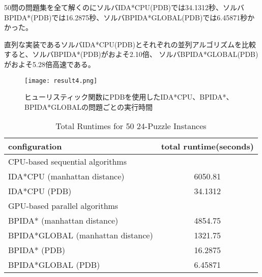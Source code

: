 \documentclass[a4paper,11pt,oneside,openany]{jsbook}
\begin{document}
50問の問題集を全て解くのにソルバIDA*CPU(PDB)では34.1312秒、ソルバBPIDA*(PDB)では16.2875秒、ソルバBPIDA*GLOBAL(PDB)では6.45871秒かかった。

直列な実装であるソルバIDA*CPU(PDB)とそれぞれの並列アルゴリズムを比較すると、ソルバBPIDA*(PDB)がおよそ2.10倍、
ソルバBPIDA*GLOBAL(PDB)がおよそ5.28倍高速である。

\begin{figure}[H]
\begin{center}
\texttt{[image: result4.png]}
\caption{ヒューリスティック関数にPDBを使用したIDA*CPU、BPIDA*、BPIDA*GLOBALの問題ごとの実行時間}
\end{center}
\end{figure}

\begin{table}[H]
\centering
\caption{Total Runtimes for 50 24-Puzzle Instances}
\label{my-label}
\begin{tabular}{|l|c|}
\hline
configuration & \multicolumn{1}{l|}{total runtime(seconds)} \\ \hline
\multicolumn{2}{|l|}{CPU-based sequential algorithms} \\ \hline
IDA*CPU (manhattan distance) & 6050.81 \\ 
IDA*CPU (PDB) & 34.1312 \\ \hline
\multicolumn{2}{|l|}{GPU-based parallel algorithms} \\ \hline
BPIDA* (manhattan distance)& 4854.75 \\
BPIDA*GLOBAL (manhattan distance) & 1321.75 \\
BPIDA* (PDB)& 16.2875 \\
BPIDA*GLOBAL (PDB) & 6.45871 \\ \hline
\end{tabular}
\end{table}





\end{document}
